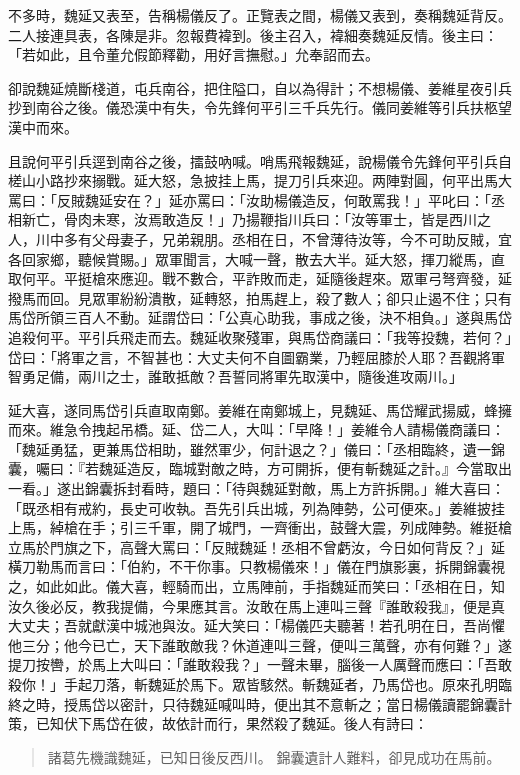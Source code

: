 不多時，魏延又表至，告稱楊儀反了。正覽表之間，楊儀又表到，奏稱魏延背反。二人接連具表，各陳是非。忽報費褘到。後主召入，褘細奏魏延反情。後主曰：「若如此，且令董允假節釋勸，用好言撫慰。」允奉詔而去。

卻說魏延燒斷棧道，屯兵南谷，把住隘口，自以為得計；不想楊儀、姜維星夜引兵抄到南谷之後。儀恐漢中有失，令先鋒何平引三千兵先行。儀同姜維等引兵扶柩望漢中而來。

且說何平引兵逕到南谷之後，擂鼓吶喊。哨馬飛報魏延，說楊儀令先鋒何平引兵自槎山小路抄來搦戰。延大怒，急披挂上馬，提刀引兵來迎。两陣對圓，何平出馬大罵曰：「反賊魏延安在？」延亦罵曰：「汝助楊儀造反，何敢罵我！」平叱曰：「丞相新亡，骨肉未寒，汝焉敢造反！」乃揚鞭指川兵曰：「汝等軍士，皆是西川之人，川中多有父母妻子，兄弟親朋。丞相在日，不曾薄待汝等，今不可助反賊，宜各回家鄉，聽候賞賜。」眾軍聞言，大喊一聲，散去大半。延大怒，揮刀縱馬，直取何平。平挺槍來應迎。戰不數合，平詐敗而走，延隨後趕來。眾軍弓弩齊發，延撥馬而回。見眾軍紛紛潰散，延轉怒，拍馬趕上，殺了數人；卻只止遏不住；只有馬岱所領三百人不動。延謂岱曰：「公真心助我，事成之後，決不相負。」遂與馬岱追殺何平。平引兵飛走而去。魏延收聚殘軍，與馬岱商議曰：「我等投魏，若何？」岱曰：「將軍之言，不智甚也：大丈夫何不自圖霸業，乃輕屈膝於人耶？吾觀將軍智勇足備，兩川之士，誰敢抵敵？吾誓同將軍先取漢中，隨後進攻兩川。」

延大喜，遂同馬岱引兵直取南鄭。姜維在南鄭城上，見魏延、馬岱耀武揚威，蜂擁而來。維急令拽起吊橋。延、岱二人，大叫：「早降！」姜維令人請楊儀商議曰：「魏延勇猛，更兼馬岱相助，雖然軍少，何計退之？」儀曰：「丞相臨終，遺一錦囊，囑曰：『若魏延造反，臨城對敵之時，方可開拆，便有斬魏延之計。』今當取出一看。」遂出錦囊拆封看時，題曰：「待與魏延對敵，馬上方許拆開。」維大喜曰：「既丞相有戒約，長史可收執。吾先引兵出城，列為陣勢，公可便來。」姜維披挂上馬，綽槍在手；引三千軍，開了城門，一齊衝出，鼓聲大震，列成陣勢。維挺槍立馬於門旗之下，高聲大罵曰：「反賊魏延！丞相不曾虧汝，今日如何背反？」延橫刀勒馬而言曰：「伯約，不干你事。只教楊儀來！」儀在門旗影裏，拆開錦囊視之，如此如此。儀大喜，輕騎而出，立馬陣前，手指魏延而笑曰：「丞相在日，知汝久後必反，教我提備，今果應其言。汝敢在馬上連叫三聲『誰敢殺我』，便是真大丈夫；吾就獻漢中城池與汝。延大笑曰：「楊儀匹夫聽著！若孔明在日，吾尚懼他三分；他今已亡，天下誰敢敵我？休道連叫三聲，便叫三萬聲，亦有何難？」遂提刀按轡，於馬上大叫曰：「誰敢殺我？」一聲未畢，腦後一人厲聲而應曰：「吾敢殺你！」手起刀落，斬魏延於馬下。眾皆駭然。斬魏延者，乃馬岱也。原來孔明臨終之時，授馬岱以密計，只待魏延喊叫時，便出其不意斬之；當日楊儀讀罷錦囊計策，已知伏下馬岱在彼，故依計而行，果然殺了魏延。後人有詩曰：

\begin{quote}
諸葛先機識魏延，已知日後反西川。
錦囊遺計人難料，卻見成功在馬前。
\end{quote}

